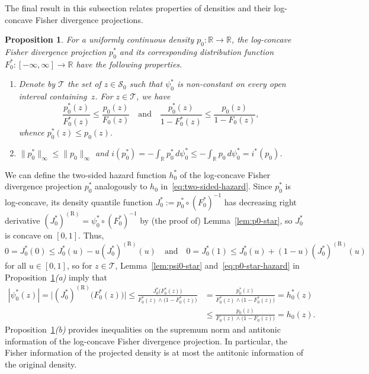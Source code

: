 \documentclass[a4paper]{article}
\newcommand{\R}{\mathbb{R}}
\newcommand{\norm}[1]{\|{#1}\|}
\newtheorem{proposition}[theorem]{Proposition}
\theoremstyle{definition}
\begin{document}
The final result in this subsection relates properties of densities and their log-concave Fisher divergence projections.  
\begin{proposition}
\label{prop:p0-star-fisher}
For a uniformly continuous density $p_0 \colon \R \to \R$, the log-concave Fisher divergence projection $p_0^*$ and its corresponding distribution function $F_0^* \colon [-\infty,\infty] \to \R$ have the following properties.
\begin{enumerate}[label=(\alph*)]
\item Denote by $\mathcal{T}$ the set of $z \in \mathcal{S}_0$ such that $\psi_0^*$ is non-constant on every open interval containing~$z$. 
For $z \in \mathcal{T}$, we have
\begin{equation}
\label{eq:p0-star-hazard}
\frac{p_0^*(z)}{F_0^*(z)} \leq \frac{p_0(z)}{F_0(z)} \quad\text{and}\quad \frac{p_0^*(z)}{1 - F_0^*(z)} \leq \frac{p_0(z)}{1 - F_0(z)},
\end{equation}
whence $p_0^*(z) \leq p_0(z)$.
\item $\norm{p_0^*}_\infty \leq \norm{p_0}_\infty$ and $i(p_0^*) = -\int_\R p_0^*\,d\psi_0^* \leq -\int_\R p_0\,d\psi_0^* = i^*(p_0)$.
\end{enumerate}
\end{proposition}
We can define the two-sided hazard function $h_0^*$ of the log-concave Fisher divergence projection $p_0^*$ analogously to $h_0$ in~\eqref{eq:two-sided-hazard}. Since $p_0^*$ is log-concave, its density quantile function $J_0^* := p_0^* \circ (F_0^*)^{-1}$ has decreasing right derivative $(J_0^*)^{(\mathrm{R})} = \psi_0^* \circ (F_0^*)^{-1}$ by (the proof of) Lemma~\ref{lem:p0-star}, so $J_0^*$ is concave on $[0,1]$. Thus,
\[
0 = J_0^*(0) \leq J_0^*(u) - u(J_0^*)^{(\mathrm{R})}(u) \quad\text{and}\quad 0 = J_0^*(1) \leq J_0^*(u) + (1 - u)(J_0^*)^{(\mathrm{R})}(u)
\]
for all $u \in [0,1]$, so for $z \in \mathcal{T}$, Lemma~\ref{lem:psi0-star} and~\eqref{eq:p0-star-hazard} in Proposition~\ref{prop:p0-star-fisher}\emph{(a)} imply that
\begin{align*}
|\psi_0^*(z)| = \bigl|(J_0^*)^{(\mathrm{R})}\bigl(F_0^*(z)\bigr)\bigr| \leq \frac{J_0^*\bigl(F_0^*(z)\bigr)}{F_0^*(z) \wedge \bigl(1 - F_0^*(z)\bigr)} &= \frac{p_0^*(z)}{F_0^*(z) \wedge \bigl(1 - F_0^*(z)\bigr)} = h_0^*(z) \\
&\leq \frac{p_0(z)}{F_0(z) \wedge \bigl(1 - F_0(z)\bigr)} = h_0(z).
\end{align*}
Proposition~\ref{prop:p0-star-fisher}\emph{(b)} provides inequalities on the supremum norm and antitonic information of the log-concave Fisher divergence projection.  In particular, the Fisher information of the projected density is at most the antitonic information of the original density.
\end{document}
